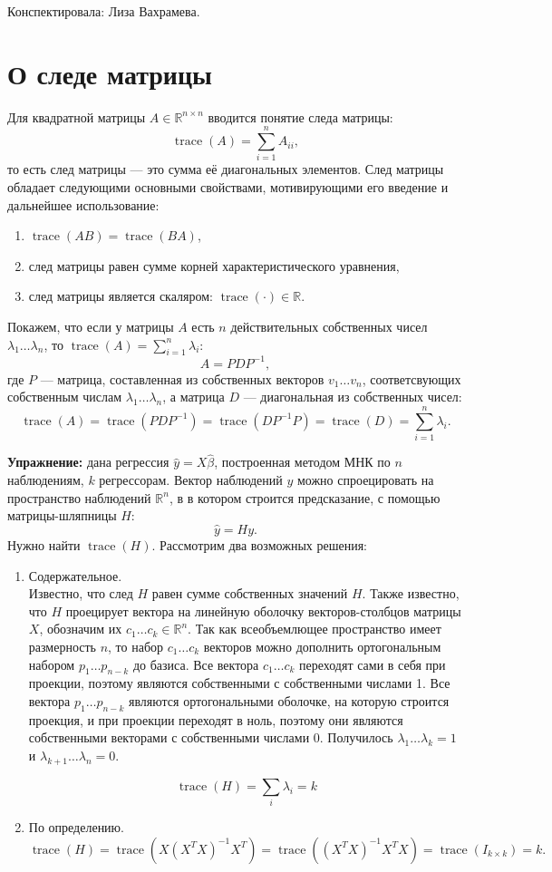 \documentclass[12pt]{article} %
\theoremstyle{definition} %
\DeclareMathOperator{\tr}{trace}
\def \RR{\mathbb{R}}
\begin{document}
Конспектировала: Лиза Вахрамева.

\section{О следе матрицы}
Для квадратной матрицы \( A \in \RR^{n \times n} \) вводится понятие следа
матрицы:
\[ \tr(A) = \sum_{i=1}^n A_{ii}, \]
то есть след матрицы — это сумма её диагональных элементов. След матрицы обладает следующими основными свойствами, мотивирующими его введение и дальнейшее использование:
\begin{enumerate}
    \item \(\tr(AB) = \tr(BA)\),
    \item след матрицы равен сумме корней характеристического уравнения,
    \item след матрицы является скаляром: \( \tr(\cdot) \in \RR \).
\end{enumerate}
Покажем, что если у матрицы \(A\) есть \(n\) действительных собственных чисел
\(\lambda_1 \dots \lambda_n\), то \( \tr(A) = \sum_{i=1}^n \lambda_i \):
\[ A = PDP^{-1},\]
где \(P\) — матрица, составленная из собственных векторов \( v_1 \dots v_n \), соответсвующих собственным числам \( \lambda_1 \dots \lambda_n \), а матрица
\(D\) — диагональная из собственных чисел:
\[ \tr(A) = \tr(PDP^{-1}) = \tr(D P^{-1} P)
= \tr(D) = \sum_{i=1}^n \lambda_i. \]

\textbf{Упражнение:} дана регрессия \( \hat{y} = X\hat{\beta} \), построенная методом МНК по \(n\) наблюдениям, \(k\)  регрессорам. Вектор наблюдений \(y\) можно спроецировать на пространство наблюдений \(\RR^n\), в в котором строится предсказание, с помощью матрицы-шляпницы \(H\):
\[\hat{y} = Hy.\]
Нужно найти \( \tr(H) \). Рассмотрим два возможных решения:
\begin{enumerate}
    \item Содержательное. \\
    Известно, что след \(H\) равен сумме собственных значений \(H\). Также известно, что  \(H\) проецирует вектора на линейную оболочку векторов-столбцов матрицы \(X\), обозначим их \( c_1 \dots c_k \in \RR^n \). Так как всеобъемлющее пространство имеет размерность \(n\), то набор \( c_1 \dots c_k \) векторов можно дополнить ортогональным набором \( p_1 \dots p_{n-k} \) до базиса. Все вектора \( c_1 \dots c_k \) переходят сами в себя при проекции, поэтому являются собственными с собственными числами 1. Все вектора \( p_1 \dots p_{n-k} \)
    являются ортогональными оболочке, на которую строится проекция, и при проекции переходят в ноль, поэтому они являются собственными векторами с собственными числами 0. Получилось \( \lambda_1 \dots \lambda_k = 1 \) и \( \lambda_{k+1} \dots \lambda_n = 0 \).

    \[ \tr(H) = \sum_i \lambda_i = k \]

    \item По определению.
    \[ \tr(H) = \tr (X(X^TX)^{-1}X^T) =
      \tr ((X^TX)^{-1} X^TX) = \tr (I_{k \times k}) = k. \]
\end{enumerate}
\end{document}
